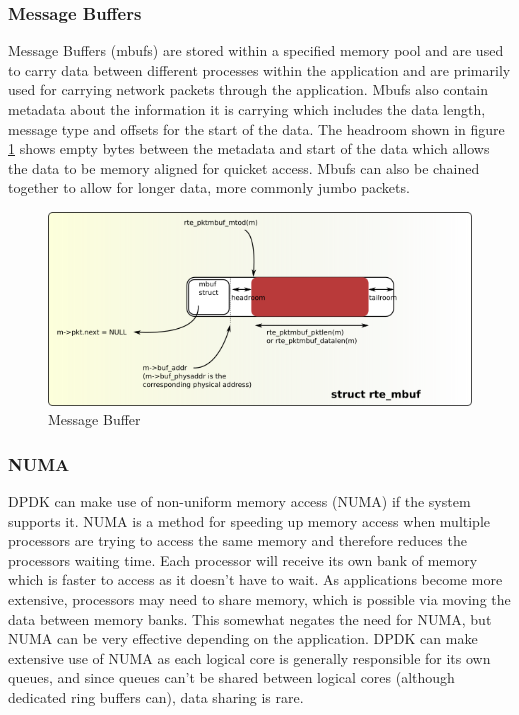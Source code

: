 \documentclass[final_report.tex]{subfiles}
\begin{document}
\subsubsection{Message Buffers}
Message Buffers (mbufs) are stored within a specified memory pool and are used to carry data between different processes within the application and are primarily used for carrying network packets through the application. Mbufs also contain metadata about the information it is carrying which includes the data length, message type and offsets for the start of the data. The headroom shown in figure \ref{fig:mbuf} shows empty bytes between the metadata and start of the data which allows the data to be memory aligned for quicket access. Mbufs can also be chained together to allow for longer data, more commonly jumbo packets.

\begin{figure}[H]
	\centering
	\includegraphics[width=\textwidth]{img/mbuf.png}
	\caption{Message Buffer}
	\label{fig:mbuf}
\end{figure}

\subsubsection{NUMA}
DPDK can make use of non-uniform memory access (NUMA) if the system supports it. NUMA is a method for speeding up memory access when multiple processors are trying to access the same memory and therefore reduces the processors waiting time. Each processor will receive its own bank of memory which is faster to access as it doesn't have to wait. As applications become more extensive, processors may need to share memory, which is possible via moving the data between memory banks. This somewhat negates the need for NUMA, but NUMA can be very effective depending on the application. DPDK can make extensive use of NUMA as each logical core is generally responsible for its own queues, and since queues can't be shared between logical cores (although dedicated ring buffers can), data sharing is rare.
\end{document}
